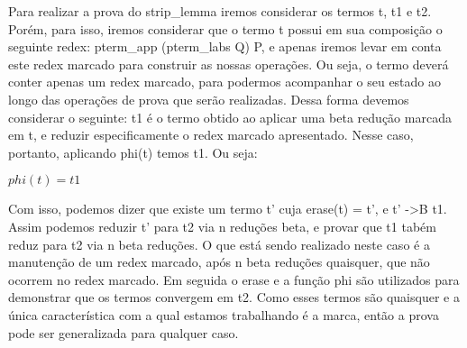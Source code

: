  Para realizar a prova do strip\_lemma iremos considerar os termos t, t1 e t2. Porém, para isso, iremos
considerar que o termo t possui em sua composição o seguinte redex: pterm\_app (pterm\_labs Q) P, e apenas
iremos levar em conta este redex marcado para construir as nossas operações. Ou seja, o termo deverá conter apenas
um redex marcado, para podermos acompanhar o seu estado ao longo das operações de prova que serão realizadas.
Dessa forma devemos considerar o seguinte: t1 é o termo obtido ao aplicar uma beta redução marcada em t, 
e reduzir especificamente o redex marcado apresentado. Nesse caso, portanto, aplicando phi(t) temos t1. Ou seja:

 $ phi(t) = t1 $ 

 Com isso, podemos dizer que existe um termo t' cuja erase(t) = t', e t' ->B t1. Assim
podemos reduzir t' para t2 via n reduções beta, e provar que t1 tabém reduz para t2 via n beta reduções. O que está sendo 
realizado neste caso é a manutenção de um redex marcado, após n beta reduções quaisquer, que não ocorrem no redex marcado. 
Em seguida o erase e a função phi são utilizados para demonstrar que os termos convergem em t2. Como esses termos são quaisquer
e a única característica com a qual estamos trabalhando é a marca, então a prova pode ser generalizada para qualquer caso.

